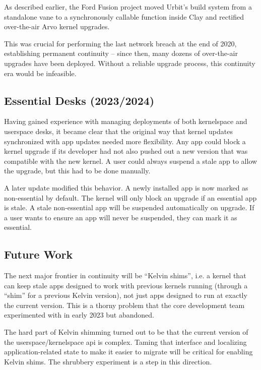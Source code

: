 \documentclass[twoside]{article}
\begin{document}
As described earlier, the Ford Fusion project moved Urbit's build system from a standalone vane to a synchronously callable function inside Clay and rectified over-the-air Arvo kernel upgrades.

\sloppy
This was crucial for performing the last network breach at the end of 2020, establishing permanent continuity – since then, many dozens of over-the-air upgrades have been deployed.  Without a reliable upgrade process, this continuity era would be infeasible.

\subsection{Essential Desks (2023/2024)}

Having gained experience with managing deployments of both kernelspace and userspace desks, it became clear that the original way that kernel updates synchronized with app updates needed more flexibility.  Any app could block a kernel upgrade if its developer had not also pushed out a new version that was compatible with the new kernel.  A user could always suspend a stale app to allow the upgrade, but this had to be done manually.

A later update modified this behavior.  A newly installed app is now marked as non-essential by default.  The kernel will only block an upgrade if an essential app is stale. A stale non-essential app will be suspended automatically on upgrade.  If a user wants to ensure an app will never be suspended, they can mark it as essential.

\subsection{Future Work}

The next major frontier in continuity will be ``Kelvin shims'', i.e. a kernel that can keep stale apps designed to work with previous kernels running (through a ``shim'' for a previous Kelvin version), not just apps designed to run at exactly the current version.  This is a thorny problem that the core development team experimented with in early 2023 but abandoned.

The hard part of Kelvin shimming turned out to be that the current version of the userspace/kernelspace {\sc api} is complex.  Taming that interface and localizing application-related state to make it easier to migrate will be critical for enabling Kelvin shims.  The shrubbery experiment is a step in this direction.
\end{document}
